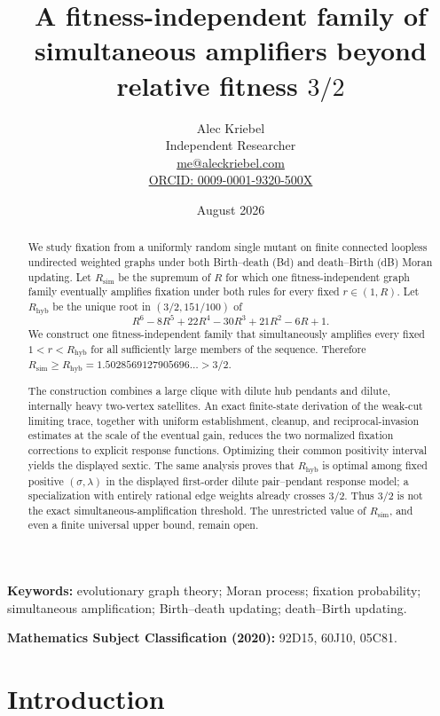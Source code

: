 \documentclass[11pt]{article}
\title{A fitness-independent family of simultaneous amplifiers beyond relative fitness $3/2$}
\author{Alec Kriebel\\
Independent Researcher\\
\href{mailto:me@aleckriebel.com}{me@aleckriebel.com}\\
\href{https://orcid.org/0009-0001-9320-500X}{ORCID: 0009-0001-9320-500X}}
\date{August 2026}
\theoremstyle{definition}
\theoremstyle{remark}
\newcommand{\Rsim}{R_{\mathrm{sim}}}
\newcommand{\Rhyb}{R_{\mathrm{hyb}}}
\begin{document}
\maketitle

\begin{abstract}
We study fixation from a uniformly random single mutant on finite connected
loopless undirected weighted graphs under both Birth--death (Bd) and
death--Birth (dB) Moran updating.  Let $\Rsim$ be the supremum of $R$
for which one fitness-independent graph family eventually amplifies fixation
under both rules for every fixed $r\in(1,R)$.  Let $\Rhyb$ be
the unique root in $(3/2,151/100)$ of
\[
 R^6-8R^5+22R^4-30R^3+21R^2-6R+1.
\]
We construct one fitness-independent family that simultaneously amplifies
every fixed $1<r<\Rhyb$ for all sufficiently large members of the sequence.
Therefore
$\Rsim\geq\Rhyb=1.5028569127905696\ldots>3/2$.

The construction combines a large clique with dilute hub pendants and
dilute, internally heavy two-vertex satellites.  An exact finite-state
derivation of the weak-cut limiting trace, together with uniform establishment, cleanup, and
reciprocal-invasion estimates at the scale of the eventual gain, reduces the two
normalized fixation corrections to explicit response functions.  Optimizing
their common positivity interval yields the displayed sextic.  The same
analysis proves that $\Rhyb$ is optimal among fixed positive
$(\sigma,\lambda)$ in the displayed first-order dilute pair--pendant response
model; a specialization with entirely rational edge weights already crosses
$3/2$.  Thus $3/2$ is not the exact simultaneous-amplification threshold.
The unrestricted value of $\Rsim$, and even a finite universal upper bound,
remain open.
\end{abstract}

\noindent\textbf{Keywords:} evolutionary graph theory; Moran process;
fixation probability; simultaneous amplification; Birth--death updating;
death--Birth updating.

\medskip
\noindent\textbf{Mathematics Subject Classification (2020):}
92D15, 60J10, 05C81.

\section{Introduction}
\end{document}
